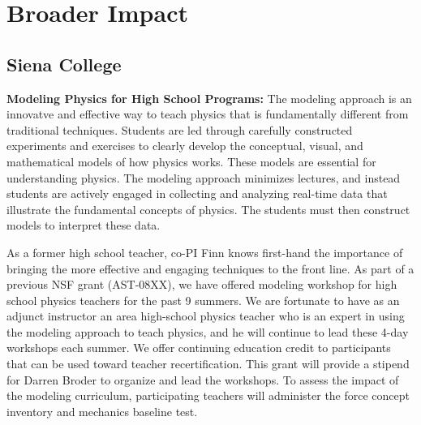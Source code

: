 \documentclass[11pt, preprint]{aastex}
\begin{document}
{\vspace*{-.7cm}
\section{Broader Impact}

\vspace*{-.4cm}
\subsection{Siena College}
\vspace*{-.4cm}

{\bf Modeling Physics for High School Programs:  }
The modeling
approach is an innovatve and effective way to teach physics that is 
fundamentally different from traditional techniques.  Students are led through
carefully constructed experiments and exercises to clearly develop the conceptual, 
visual, and mathematical models of how physics works.  
These models are essential for understanding physics.
The modeling approach minimizes lectures, and instead 
students are actively engaged in collecting and analyzing real-time data
that illustrate the fundamental concepts of physics.   The students must
then construct models to interpret these
data.  

As a former high school teacher, co-PI Finn knows first-hand the importance of 
bringing the more effective and engaging techniques to the front line.
As part of a previous NSF grant (AST-08XX), we have offered 
modeling workshop for high school physics teachers for the past 9 summers.
We are fortunate
to have as an adjunct instructor an area high-school physics teacher who
is an expert in using the modeling approach to teach physics, and
he will continue to lead these 4-day workshops each summer.  
We offer continuing education credit to participants 
that can be used toward teacher recertification.
This grant will provide a stipend for Darren Broder to organize and lead
the workshops.  
To assess the impact of the modeling curriculum, participating teachers
will administer the force concept inventory and mechanics baseline test.


}
\end{document}
